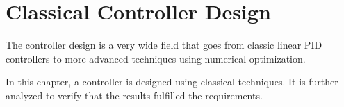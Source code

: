 \chapter{Classical Controller Design}\label{chap:controllerDesign}
The controller design is a very wide field that goes from classic linear PID controllers to more advanced techniques using numerical optimization.

In this chapter, a controller is designed using classical techniques. It is further analyzed to verify that the results fulfilled the requirements.
